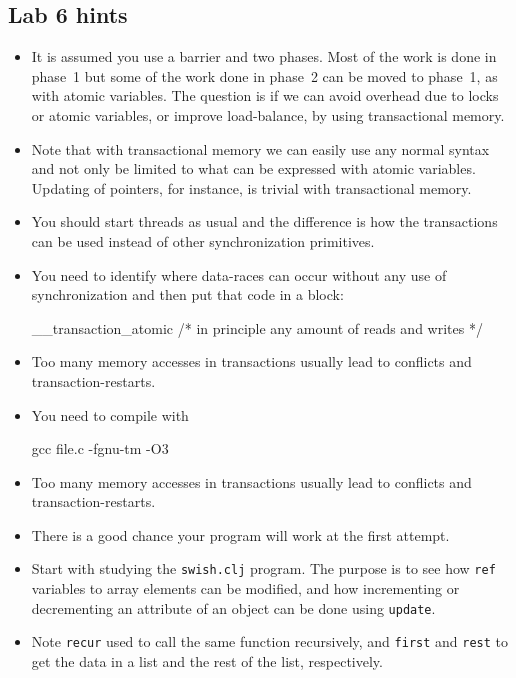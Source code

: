 \documentclass{forsete}
\begin{document}
\subsection*{Lab 6 hints}
\begin{itemize}
\item It is assumed you use a barrier and two phases. Most of the work is done in phase~1 but some 
of the work done in phase~2 can be moved to phase~1, as with atomic variables. The question is
if we can avoid overhead due to locks or atomic variables, or improve load-balance, by using transactional memory.
\item Note that with transactional memory we can easily use any normal syntax and not only 
be limited to what can be expressed with atomic variables. Updating of pointers, for instance, is 
trivial with transactional memory.
\item You should start threads as usual and the difference is how the transactions can be used
instead of other synchronization primitives. 
\item You need to identify where data-races can occur without any use of synchronization and then
put that code in a block:
\begin{ccode}
__transaction_atomic {
	/* in principle any amount of reads and writes */
}
\end{ccode}
\item Too many memory accesses in transactions usually lead to conflicts and transaction-restarts.
\item You need to compile with
\begin{ccode}
gcc file.c -fgnu-tm -O3
\end{ccode}
\item Too many memory accesses in transactions usually lead to conflicts and transaction-restarts.
\item There is a good chance your program will work at the first attempt.

\item Start with studying the \verb!swish.clj! program. The purpose is to see how \verb.ref. variables
to array elements can be modified, and how incrementing or decrementing an attribute of an
object can be done using \verb!update!.
\item Note \verb.recur. used to call the same function recursively, and \verb!first! and \verb!rest!
to get the data in a list and the rest of the list, respectively.


\end{itemize}
\end{document}
